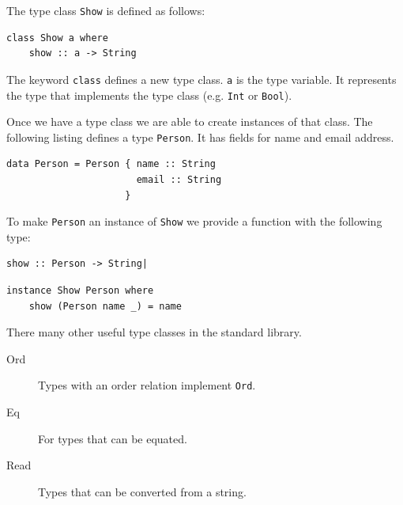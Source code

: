 The type class \verb|Show| is defined as follows:
\begin{verbatim}
class Show a where
    show :: a -> String
\end{verbatim}
The keyword \verb|class| defines a new type class. \verb|a| is the type variable. It represents the type that implements the type class (e.g. \verb|Int| or \verb|Bool|).

Once we have a type class we are able to create instances of that class. The following listing defines a type \verb|Person|. It has fields for name and email address. 
\begin{verbatim}
data Person = Person { name :: String
                       email :: String
                     }
\end{verbatim}

To make \verb|Person| an instance of \verb|Show| we provide a function with the following type:
\begin{verbatim}
show :: Person -> String|
\end{verbatim}

\begin{verbatim}
instance Show Person where
    show (Person name _) = name
\end{verbatim}

There many other useful type classes in the standard library.

\begin{description}
\item[Ord] Types with an order relation implement \verb|Ord|.
\item[Eq] For types that can be equated.
\item[Read] Types that can be converted from a string.
\end{description}

